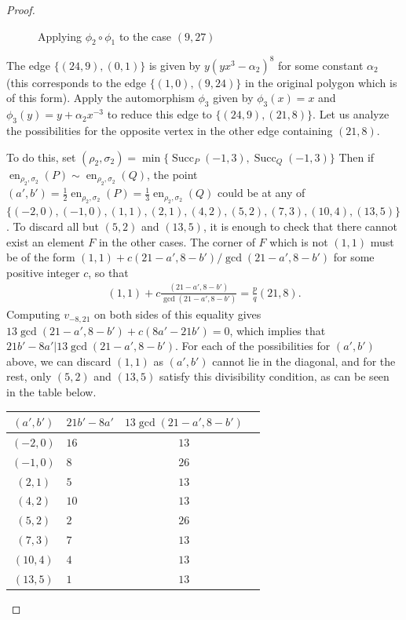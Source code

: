 \documentclass[reqno,a4paper,twoside]{amsart}
\newcommand{\ra}[1]{\renewcommand{\arraystretch}{#1}}
\theoremstyle{definition}
\theoremstyle{remark}
\DeclareMathOperator{\en}{en}
\DeclareMathOperator{\Succ}{Succ}
\begin{document}
\begin{proof}
\begin{figure}[htb]
\caption{Applying $\phi_2\circ \phi_1$ to the case $(9,27)$}
\end{figure}
	
	The edge $\{(24,9), (0,1)\}$ is given by $y(yx^3 - \alpha_2)^8$ for some constant $\alpha_2$ (this corresponds to the edge $\{(1,0), (9,24)\}$ in the original polygon which is of this form). Apply the automorphism $\phi_3$ given by $\phi_3(x) = x$ and $\phi_3(y) = y + \alpha_2 x^{-3}$ to reduce this edge to $\{(24,9), (21,8)\}$. Let us analyze the possibilities for the opposite vertex in the other edge containing $(21,8)$.
	
	To do this, set $(\rho_2, \sigma_2) = \min\{\Succ_P(-1,3), \Succ_Q(-1,3)\}$ Then if $\en_{\rho_2,\sigma_2}(P) \sim \en_{\rho_2,\sigma_2}(Q)$, the point $(a',b') = \frac{1}{2} \en_{\rho_2,\sigma_2}(P) = \frac{1}{3} \en_{\rho_2,\sigma_2}(Q)$ could be at any of \\
$\{(-2,0),(-1,0),(1,1),(2,1),(4,2),(5,2),(7,3),(10,4),(13,5)\}$. To discard all but $(5,2)$ and $(13,5)$, it is enough to check that there cannot exist an element $F$ in the other cases. The corner of $F$ which is not $(1,1)$ must be of the form $(1,1) + c(21-a',8-b')/\gcd(21-a',8-b')$ for some positive integer $c$, so that
\begin{align*}
	(1,1) + c\frac{(21-a', 8-b')}{\gcd(21-a',8-b')} = \frac{p}{q} (21,8).
\end{align*}
Computing $v_{-8,21}$ on both sides of this equality gives $13\gcd(21-a',8-b') + c(8a' - 21b') = 0$, which implies that $21b' - 8a' | 13 \gcd(21-a',8-b')$. For each of the possibilities for $(a',b')$ above, we can discard $(1,1)$ as $(a',b')$ cannot lie in the diagonal, and for the rest, only $(5,2)$ and $(13,5)$ satisfy this divisibility condition, as can be seen in the table below.
%
\begin{center}
\ra{1.2}
\begin{tabular}[t]{clcc}
\toprule
$(a',b')$ & $21b' - 8a'$ & $13 \gcd(21-a', 8-b')$ \\
\midrule
$(-2,0)$ & $16$ & $13$  \\
$(-1,0)$ & $8$ & $26$ \\
$(2,1)$ & $5$ & $13$ \\
$(4,2)$ & $10$ & $13$ \\
$(5,2)$ & $2$ & $26$ \\
$(7,3)$ & $7$ & $13$ \\
$(10,4)$ & $4$ & $13$ \\
$(13,5)$ & $1$ & $13$ \\
\bottomrule
\end{tabular}
\end{center}


\end{proof}
\end{document}
